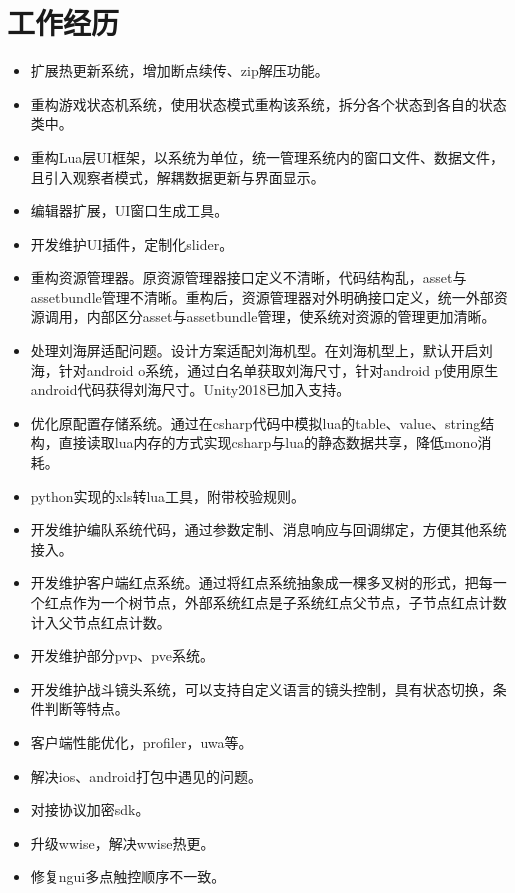 \documentclass{resume}
\begin{document}
\section{工作经历}
\begin{itemize}
  \item 扩展热更新系统，增加断点续传、zip解压功能。
  \item 重构游戏状态机系统，使用状态模式重构该系统，拆分各个状态到各自的状态类中。
  \item 重构Lua层UI框架，以系统为单位，统一管理系统内的窗口文件、数据文件，且引入观察者模式，解耦数据更新与界面显示。
  \item 编辑器扩展，UI窗口生成工具。
  \item 开发维护UI插件，定制化slider。
  \item 重构资源管理器。原资源管理器接口定义不清晰，代码结构乱，asset与assetbundle管理不清晰。重构后，资源管理器对外明确接口定义，统一外部资源调用，内部区分asset与assetbundle管理，使系统对资源的管理更加清晰。
  \item 处理刘海屏适配问题。设计方案适配刘海机型。在刘海机型上，默认开启刘海，针对android o系统，通过白名单获取刘海尺寸，针对android p使用原生android代码获得刘海尺寸。Unity2018已加入支持。
  \item 优化原配置存储系统。通过在csharp代码中模拟lua的table、value、string结构，直接读取lua内存的方式实现csharp与lua的静态数据共享，降低mono消耗。
  \item python实现的xls转lua工具，附带校验规则。
  \item 开发维护编队系统代码，通过参数定制、消息响应与回调绑定，方便其他系统接入。
  \item 开发维护客户端红点系统。通过将红点系统抽象成一棵多叉树的形式，把每一个红点作为一个树节点，外部系统红点是子系统红点父节点，子节点红点计数计入父节点红点计数。
  \item 开发维护部分pvp、pve系统。
  \item 开发维护战斗镜头系统，可以支持自定义语言的镜头控制，具有状态切换，条件判断等特点。
  \item 客户端性能优化，profiler，uwa等。
  \item 解决ios、android打包中遇见的问题。
  \item 对接协议加密sdk。
  \item 升级wwise，解决wwise热更。
  \item 修复ngui多点触控顺序不一致。
\end{itemize}


%
%
\end{document}
